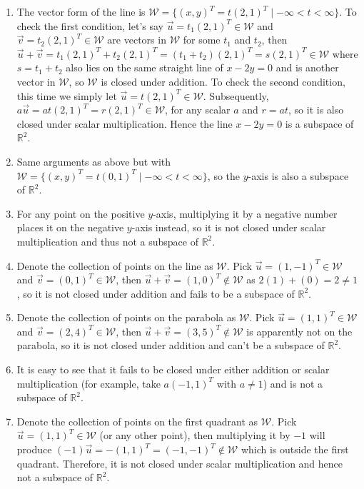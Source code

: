 \begin{solution}
\begin{enumerate}[label=(\alph*)]
\item The vector form of the line is $\mathcal{W} = \{(x,y)^T = t(2,1)^T \mid -\infty < t < \infty\}$. To check the first condition, let's say $\vec{u} = t_1(2,1)^T \in \mathcal{W}$ and $\vec{v} = t_2(2,1)^T \in \mathcal{W}$ are vectors in $\mathcal{W}$ for some $t_1$ and $t_2$, then $\vec{u} + \vec{v} = t_1(2,1)^T + t_2(2,1)^T = (t_1 + t_2)(2,1)^T = s(2,1)^T \in \mathcal{W}$ where $s = t_1 + t_2$ also lies on the same straight line of $x-2y = 0$ and is another vector in $\mathcal{W}$, so $\mathcal{W}$ is closed under addition. To check the second condition, this time we simply let $\vec{u} = t(2,1)^T \in \mathcal{W}$. Subsequently, $a\vec{u} = at(2,1)^T = r(2,1)^T \in \mathcal{W}$, for any scalar $a$ and $r = at$, so it is also closed under scalar multiplication. Hence the line $x-2y = 0$ is a subspace of $\mathbb{R}^2$.
\item Same arguments as above but with $\mathcal{W} = \{(x,y)^T = t(0,1)^T \mid -\infty < t < \infty\}$, so the $y$-axis is also a subspace of $\mathbb{R}^2$.
\item For any point on the positive $y$-axis, multiplying it by a negative number places it on the negative $y$-axis instead, so it is not closed under scalar multiplication and thus not a subspace of $\mathbb{R}^2$. 
\item Denote the collection of points on the line as $\mathcal{W}$. Pick $\vec{u} = (1, -1)^T \in \mathcal{W}$ and $\vec{v} = (0, 1)^T \in \mathcal{W}$, then $\vec{u} + \vec{v} = (1, 0)^T \notin \mathcal{W}$ as $2(1) + (0) = 2 \neq 1$, so it is not closed under addition and fails to be a subspace of $\mathbb{R}^2$.
\item Denote the collection of points on the parabola as $\mathcal{W}$. Pick $\vec{u} = (1,1)^T \in \mathcal{W}$ and $\vec{v} = (2,4)^T \in \mathcal{W}$, then $\vec{u} + \vec{v} = (3,5)^T \notin \mathcal{W}$ is apparently not on the parabola, so it is not closed under addition and can't be a subspace of $\mathbb{R}^2$.
\item It is easy to see that it fails to be closed under either addition or scalar multiplication (for example, take $a(-1,1)^T$ with $a\neq 1$) and is not a subspace of $\mathbb{R}^2$.
\item Denote the collection of points on the first quadrant as $\mathcal{W}$. Pick $\vec{u} = (1,1)^T \in \mathcal{W}$ (or any other point), then multiplying it by $-1$ will produce $(-1)\vec{u} = -(1,1)^T = (-1,-1)^T \notin \mathcal{W}$ which is outside the first quadrant. Therefore, it is not closed under scalar multiplication and hence not a subspace of $\mathbb{R}^2$.

\end{enumerate}
\end{solution}
